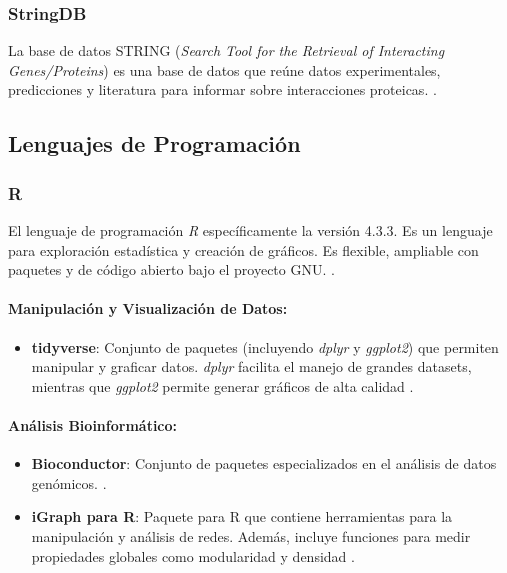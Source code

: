 \subsubsection{StringDB}
La base de datos STRING (\textit{Search Tool for the Retrieval of Interacting Genes/Proteins}) es una base de datos que reúne datos experimentales, predicciones y literatura para informar sobre interacciones proteicas. \cite{szklarczyk2019}.

\subsection{Lenguajes de Programación}

\subsubsection{R}
El lenguaje de programación \textit{R} específicamente la versión 4.3.3. Es un lenguaje para exploración estadística y creación de gráficos. Es flexible, ampliable con paquetes y de código abierto bajo el proyecto GNU. \cite{chan2018}.


\paragraph{Manipulación y Visualización de Datos:}
\begin{itemize}
	\item \textbf{tidyverse}: Conjunto de paquetes (incluyendo \textit{dplyr} y \textit{ggplot2}) que permiten manipular y graficar datos. \textit{dplyr} facilita el manejo de grandes datasets, mientras que \textit{ggplot2} permite generar gráficos de alta calidad \cite{Wickham2019}.
\end{itemize}

\paragraph{Análisis Bioinformático:}
\begin{itemize}
	\item \textbf{Bioconductor}: Conjunto de paquetes especializados en el análisis de datos genómicos. \cite{Huber2015}.
	\item \textbf{iGraph para R}: Paquete para R que contiene herramientas para la manipulación y análisis de redes. Además, incluye funciones para medir propiedades globales como modularidad y densidad \cite{Csardi2006}.
\end{itemize}


